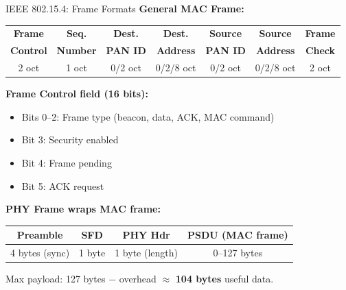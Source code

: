 \documentclass[aspectratio=169,11pt]{beamer}
\begin{document}
\begin{frame}{IEEE 802.15.4: Frame Formats}
    \textbf{General MAC Frame:}
    
    \vspace{0.2cm}
    \begin{center}
    \footnotesize
    \begin{tabular}{|c|c|c|c|c|c|c|}
        \hline
        \textbf{Frame} & \textbf{Seq.} & \textbf{Dest.} & \textbf{Dest.} & \textbf{Source} & \textbf{Source} & \textbf{Frame} \\
        \textbf{Control} & \textbf{Number} & \textbf{PAN ID} & \textbf{Address} & \textbf{PAN ID} & \textbf{Address} & \textbf{Check} \\
        \hline
        2 oct & 1 oct & 0/2 oct & 0/2/8 oct & 0/2 oct & 0/2/8 oct & 2 oct \\
        \hline
    \end{tabular}
    \normalsize
    \end{center}
    
    \vspace{0.2cm}
    \textbf{Frame Control field (16 bits):}
    \begin{itemize}
        \item Bits 0--2: Frame type (beacon, data, ACK, MAC command)
        \item Bit 3: Security enabled
        \item Bit 4: Frame pending
        \item Bit 5: ACK request
    \end{itemize}
    
    \vspace{0.2cm}
    \textbf{PHY Frame wraps MAC frame:}
    \begin{center}
    \footnotesize
    \begin{tabular}{|c|c|c|c|}
        \hline
        \textbf{Preamble} & \textbf{SFD} & \textbf{PHY Hdr} & \textbf{PSDU (MAC frame)} \\
        \hline
        4 bytes (sync) & 1 byte & 1 byte (length) & 0--127 bytes \\
        \hline
    \end{tabular}
    \normalsize
    \end{center}
    
    Max payload: 127 bytes $-$ overhead $\approx$ \textbf{104 bytes} useful data.
\end{frame}
\end{document}

